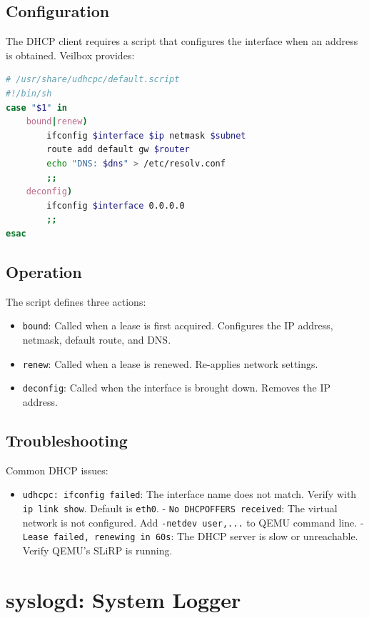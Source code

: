 \subsection{Configuration}

The DHCP client requires a script that configures the interface when an
address is obtained. Veilbox provides:

\begin{lstlisting}[language=bash]
# /usr/share/udhcpc/default.script
#!/bin/sh
case "$1" in
    bound|renew)
        ifconfig $interface $ip netmask $subnet
        route add default gw $router
        echo "DNS: $dns" > /etc/resolv.conf
        ;;
    deconfig)
        ifconfig $interface 0.0.0.0
        ;;
esac
\end{lstlisting}

\subsection{Operation}

The script defines three actions:
\begin{itemize}[nosep]
  \item \texttt{bound}: Called when a lease is first acquired. Configures
        the IP address, netmask, default route, and DNS.
  \item \texttt{renew}: Called when a lease is renewed. Re-applies
        network settings.
  \item \texttt{deconfig}: Called when the interface is brought down.
        Removes the IP address.
\end{itemize}

\subsection{Troubleshooting}

Common DHCP issues:
\begin{itemize}[nosep]
  \item \texttt{udhcpc: ifconfig failed}: The interface name does not
        match. Verify with \texttt{ip link show}. Default is \texttt{eth0}.
  - \texttt{No DHCPOFFERS received}: The virtual network is not configured.
        Add \texttt{-netdev user,...} to QEMU command line.
  - \texttt{Lease failed, renewing in 60s}: The DHCP server is slow or
        unreachable. Verify QEMU's SLiRP is running.
\end{itemize}

\section{syslogd: System Logger}

